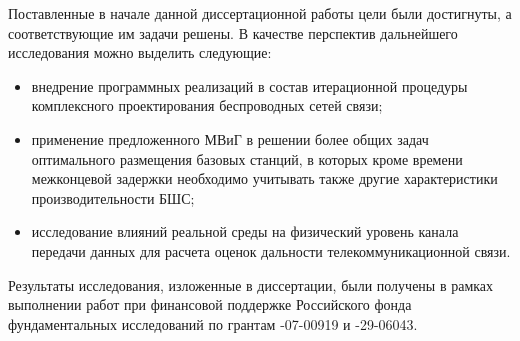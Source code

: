 Поставленные в начале данной диссертационной работы цели были достигнуты, а соответствующие им задачи решены. В качестве перспектив дальнейшего исследования можно выделить следующие:
\begin{itemize}
    \item внедрение программных реализаций в состав итерационной процедуры комплексного проектирования беспроводных сетей связи;
    \item  применение предложенного МВиГ в решении более общих   задач оптимального размещения базовых станций, в которых кроме времени межконцевой задержки необходимо учитывать также  другие характеристики производительности БШС;
    \item исследование влияний реальной среды на физический уровень канала передачи данных для расчета оценок дальности телекоммуникационной связи.
    
\end{itemize}

Результаты исследования, изложенные в диссертации, были получены в рамках выполнении работ при финансовой поддержке Российского фонда фундаментальных исследований по грантам -07-00919 и  -29-06043.



% 

